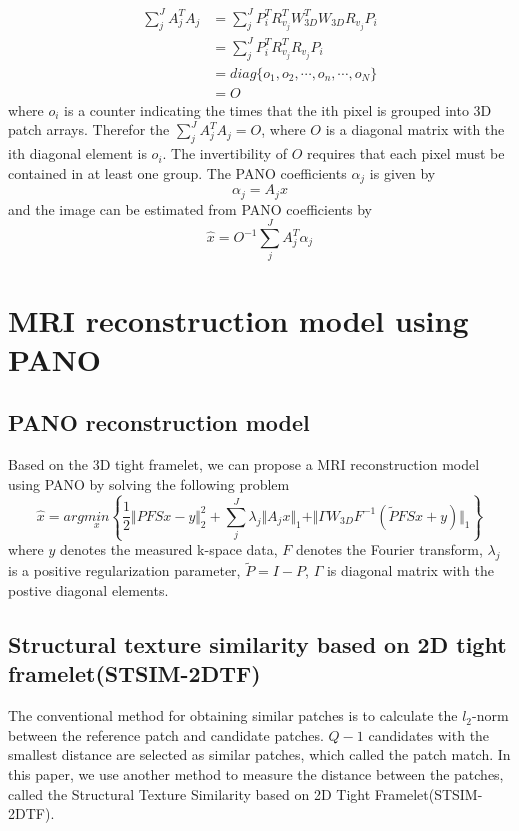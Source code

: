 \documentclass[UTF8]{article}
\begin{document}
\begin{align*}
	\sum_{j}^{J}A_j^TA_j &= \sum_{j}^{J} P_i^TR_{v_j}^TW_{3D}^TW_{3D}R_{v_j}P_i \\
						 &= \sum_{j}^{J} P_i^TR_{v_j}^TR_{v_j}P_i \\
						 & = diag\{o_1, o_2, \cdots, o_n, \cdots, o_N\} \\
						 & = O
\end{align*}
where $o_i$ is a counter indicating the times that the ith pixel is grouped into 3D patch arrays. Therefor the $\sum_{j}^{J}A_j^TA_j = O$, where $O$ is a diagonal matrix with the ith diagonal element is $o_i$. The invertibility of $O$ requires that each pixel must be contained in at least one group. The PANO coefficients $\alpha_j$ is given by
\begin{equation}
	\alpha_j = A_j x
\end{equation}
and the image  can be estimated from PANO coefficients by
\begin{equation}
	\hat{x} = O^{-1} \sum_j^J A_j^T \alpha_j
\end{equation}

\section{MRI reconstruction model using PANO}
\subsection{PANO reconstruction model}
Based on the 3D tight framelet, we can propose a MRI reconstruction model using PANO by solving the following problem
\begin{equation} \label{PANOModel}
	\hat{x}=arg \underset{x}{min} \left\lbrace  \frac{1}{2} \Vert PFS x-y \Vert_2^2 +\sum_{j}^{J} \lambda_j \Vert A_j x\Vert_1  + \Vert \Gamma W_{3D}F^{-1}(\tilde{P}FSx+y) \Vert_1 \right\rbrace 
\end{equation}
where $y$ denotes the measured k-space data, $F$ denotes the  Fourier transform, $\lambda_j$ is a positive regularization parameter, $\tilde{P} = I - P$, $\Gamma $ is diagonal matrix with the postive diagonal elements.

\subsection{Structural texture similarity based on 2D tight framelet(STSIM-2DTF)}
\par  The conventional method for obtaining similar patches is to calculate the $l_2$-norm between the reference patch and candidate patches. $Q-1$ candidates with the smallest distance are selected as similar patches, which called the patch match. In this paper, we use another method to measure the distance between the patches, called the  Structural Texture Similarity based on 2D Tight Framelet(STSIM-2DTF).
\end{document}

